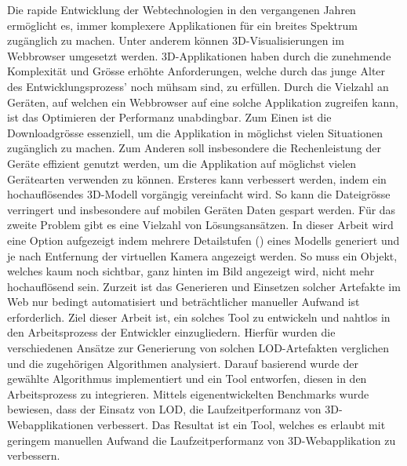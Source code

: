 Die rapide Entwicklung der Webtechnologien in den vergangenen Jahren ermöglicht es, immer komplexere Applikationen für ein breites Spektrum zugänglich zu machen. Unter anderem können 3D-Visualisierungen im Webbrowser umgesetzt werden.
3D-Applikationen haben durch die zunehmende Komplexität und Grösse erhöhte Anforderungen, welche durch das junge Alter des Entwicklungsprozess' noch mühsam sind, zu erfüllen.
Durch die Vielzahl an Geräten, auf welchen ein Webbrowser auf eine solche Applikation zugreifen kann, ist das Optimieren der Performanz unabdingbar.
Zum Einen ist die Downloadgrösse essenziell, um die Applikation in möglichst vielen Situationen zugänglich zu machen. Zum Anderen soll insbesondere die Rechenleistung der Geräte effizient genutzt werden, um die Applikation auf möglichst vielen Gerätearten verwenden zu können.
Ersteres kann verbessert werden, indem ein hochauflösendes 3D-Modell vorgängig vereinfacht wird. So kann die Dateigrösse verringert und insbesondere auf mobilen Geräten Daten gespart werden.
Für das zweite Problem gibt es eine Vielzahl von Lösungsansätzen. In dieser Arbeit wird eine Option aufgezeigt indem mehrere Detailstufen () eines Modells generiert und je nach Entfernung der virtuellen Kamera angezeigt werden. So muss ein Objekt, welches kaum noch sichtbar, ganz hinten im Bild angezeigt wird, nicht mehr hochauflösend sein.
Zurzeit ist das Generieren und Einsetzen solcher Artefakte im Web nur bedingt automatisiert und beträchtlicher manueller Aufwand ist erforderlich.
Ziel dieser Arbeit ist, ein solches Tool zu entwickeln und nahtlos in den Arbeitsprozess der Entwickler einzugliedern.
\bigbreak
Hierfür wurden die verschiedenen Ansätze zur Generierung von solchen LOD-Artefakten verglichen und die zugehörigen Algorithmen analysiert.
Darauf basierend wurde der gewählte Algorithmus implementiert und ein Tool entworfen, diesen in den Arbeitsprozess zu integrieren.
Mittels eigenentwickelten Benchmarks wurde bewiesen, dass der Einsatz von LOD, die Laufzeitperformanz von 3D-Webapplikationen verbessert.
\bigbreak
Das Resultat ist ein Tool, welches es erlaubt mit geringem manuellen Aufwand die Laufzeitperformanz von 3D-Webapplikation zu verbessern.

